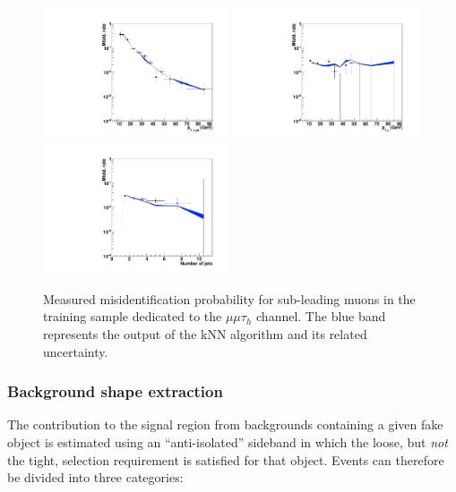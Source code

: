 \begin{figure}
\centering
\includegraphics[width=0.49\textwidth]{4_Analisys/pics/8TeV/plots/fakerates/m_mmt_subleading_kNN_muonJetPt.pdf}
\includegraphics[width=0.49\textwidth]{4_Analisys/pics/8TeV/plots/fakerates/m_mmt_subleading_kNN_muonPt.pdf}\\
\includegraphics[width=0.49\textwidth]{4_Analisys/pics/8TeV/plots/fakerates/m_mmt_subleading_kNN_numJets20.pdf}
\caption{Measured misidentification probability for sub-leading muons in the training sample dedicated to the $\mu\mu\tau_h$ channel. The blue band represents the output of the kNN algorithm and its related uncertainty.}
\label{fig:fake_rate_sample}
\end{figure}


\subsubsection{Background shape extraction}
The contribution to the signal region from backgrounds containing a given fake object is estimated using an ``anti-isolated'' sideband in which the loose, but \emph{not} the tight, 
selection requirement is satisfied for that object. Events can therefore be divided into three categories:

